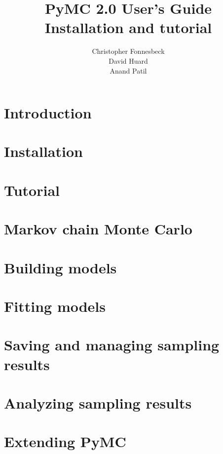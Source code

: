 \documentclass[]{manual}
\title{PyMC 2.0 User's Guide \\
Installation and tutorial}
\author{ Christopher Fonnesbeck\\ David Huard \\ Anand Patil }
\begin{document}
\maketitle

\tableofcontents

\chapter{Introduction} 
\label{chap:intro} 


\chapter{Installation} 
\label{chap:install} 


\chapter{Tutorial}
\label{chap:tutorial}


\chapter{Markov chain Monte Carlo} 
\label{chap:MCMC} 


\chapter{Building models}
\label{chap:modelbuilding} 


\chapter{Fitting models}
\label{chap:modelfitting}


\chapter{Saving and managing sampling results}
\label{chap:database} 


\chapter{Analyzing sampling results} 
\label{chap:analyzing}


\chapter{Extending PyMC}
\label{chap:extending}

\end{document}
